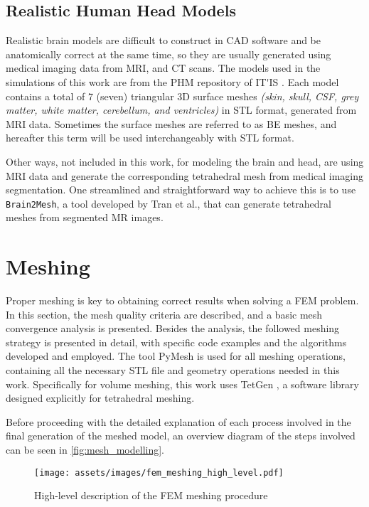 \subsection{Realistic Human Head Models}
\label{sec:phm_models}

Realistic brain models are difficult to construct in \gls{CAD} software and be anatomically correct at the same time, so they are usually generated using medical imaging data from \gls{MRI}, and \gls{CT} scans. The models used in the simulations of this work are from the \gls{PHM} repository of \gls{IT'IS} \cite{ErikG.Lee2016,Lee2018,ITstissue}. Each model contains a total of 7 (seven) triangular 3D surface meshes \textit{(skin, skull, \gls{CSF}, grey matter, white matter, cerebellum, and ventricles)} in \gls{STL} format, generated from \gls{MRI} data. Sometimes the surface meshes are referred to as \gls{BE} meshes, and hereafter this term will be used interchangeably with \gls{STL} format.

Other ways, not included in this work, for modeling the brain and head, are using \gls{MRI} data and generate the corresponding tetrahedral mesh from medical imaging segmentation. One streamlined and straightforward way to achieve this is to use \texttt{Brain2Mesh}, a tool developed by Tran et al.\cite{Tran2020}, that can generate tetrahedral meshes from segmented \gls{MR} images.

\section{Meshing}
\label{sec:fem_meshing}

Proper meshing is key to obtaining correct results when solving a \gls{FEM} problem. In this section, the mesh quality criteria are described, and a basic mesh convergence analysis is presented. Besides the analysis, the followed meshing strategy is presented in detail, with specific code examples and the algorithms developed and employed. The tool PyMesh \cite{pymesh} is used for all meshing operations, containing all the necessary \gls{STL} file and geometry operations needed in this work. Specifically for volume meshing, this work uses TetGen \cite{tetgen}, a software library designed explicitly for tetrahedral meshing.

Before proceeding with the detailed explanation of each process involved in the final generation of the meshed model, an overview diagram of the steps involved can be seen in \autoref{fig:mesh_modelling}.

\begin{figure}[H]
    \centering
    \texttt{[image: assets/images/fem\_meshing\_high\_level.pdf]}
    \caption{High-level description of the \gls{FEM} meshing procedure}
    \label{fig:mesh_modelling}
\end{figure}

